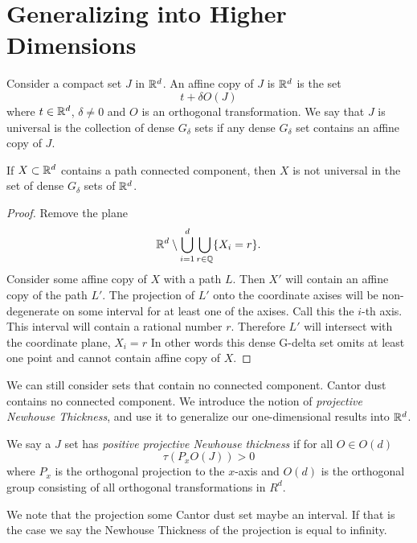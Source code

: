 \section{Generalizing into Higher Dimensions}

Consider a compact set $J$ in $\mathbb{R}^d$. An affine copy of $J$ is $\mathbb{R}^d$ is the set 
$$
t+\delta O (J)
$$
where $t\in \mathbb{R}^d$, $\delta\ne 0$ and $O$ is an orthogonal transformation. We say that $J$ is universal is the collection of dense $G_{\delta}$ sets if any dense $G_{\delta}$ set contains an affine copy of $J$. 
\begin{theorem}
    If $X\subset \mathbb{R}^d$ contains a path connected component, then $X$ is not universal in the set of dense $G_\delta$ sets of $\mathbb{R}^d$.  
\end{theorem}
\begin{proof}
    Remove the plane $$\mathbb{R}^d \setminus \bigcup_{i=1}^d \bigcup_{r \in \mathbb{Q}} \{X_i = r \}.$$
    Consider some affine copy of $X$ with a path $L$.  Then $X'$ will contain an affine copy of the path $L'$.  The projection of $L'$ onto the coordinate axises will be non-degenerate on some interval for at least one of the axises.  Call this the $i$-th axis.  This interval will contain a rational number $r$.  Therefore $L'$ will intersect with the coordinate plane, $X_i = r$ 
    In other words this dense G-delta set omits at least one point and cannot contain affine copy of $X$.  
\end{proof}
 We can still consider sets that contain no connected component.  Cantor dust contains no connected component.  We introduce the notion of \textit{projective Newhouse Thickness}, and use it to generalize our one-dimensional results into $\mathbb{R}^d$.  
\begin{definition}
    We say a $J$ set has {\it positive projective Newhouse thickness} if for all $O \in O(d)$ 
$$
 \tau(P_xO(J)) > 0
$$
where $P_x$ is the orthogonal projection to the $x$-axis and $O(d)$ is the orthogonal group consisting of all orthogonal transformations in $R^d$.  
\end{definition}

We note that the projection some Cantor dust set maybe an interval.  If that is the case we say the Newhouse Thickness of the projection is equal to infinity.  

